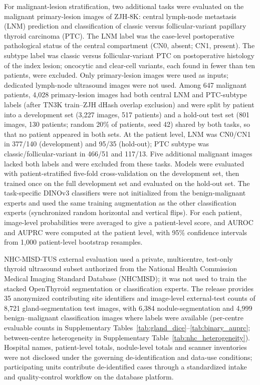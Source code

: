 \documentclass[fleqn,10pt]{wlscirep}
\begin{document}
For malignant-lesion stratification, two additional tasks were evaluated on the malignant primary-lesion images of ZJH-8K: central lymph-node metastasis (LNM) prediction and classification of classic versus follicular-variant papillary thyroid carcinoma (PTC). The LNM label was the case-level postoperative pathological status of the central compartment (CN0, absent; CN1, present). The subtype label was classic versus follicular-variant PTC on postoperative histology of the index lesion; oncocytic and clear-cell variants, each found in fewer than ten patients, were excluded. Only primary-lesion images were used as inputs; dedicated lymph-node ultrasound images were not used. Among 647 malignant patients, 4,028 primary-lesion images had both central LNM and PTC-subtype labels (after TN3K train--ZJH dHash overlap exclusion) and were split by patient into a development set (3,227 images, 517 patients) and a hold-out test set (801 images, 130 patients; random 20\% of patients, seed 42) shared by both tasks, so that no patient appeared in both sets. At the patient level, LNM was CN0/CN1 in 377/140 (development) and 95/35 (hold-out); PTC subtype was classic/follicular-variant in 466/51 and 117/13. Five additional malignant images lacked both labels and were excluded from these tasks. Models were evaluated with patient-stratified five-fold cross-validation on the development set, then trained once on the full development set and evaluated on the hold-out set. The task-specific DINOv3 classifiers were not initialized from the benign-malignant experts and used the same training augmentation as the other classification experts (synchronized random horizontal and vertical flips). For each patient, image-level probabilities were averaged to give a patient-level score, and AUROC and AUPRC were computed at the patient level, with 95\% confidence intervals from 1,000 patient-level bootstrap resamples.

NHC-MISD-TUS external evaluation used a private, multicentre, test-only thyroid ultrasound subset authorized from the National Health Commission Medical Imaging Standard Database (NHCMISD); it was not used to train the stacked OpenThyroid segmentation or classification experts. The release provides 35 anonymized contributing site identifiers and image-level external-test counts of 8{,}721 gland-segmentation test images, with 6{,}384 nodule-segmentation and 4{,}999 benign--malignant classification images where labels were available (per-centre evaluable counts in Supplementary Tables~\ref{tab:gland_dice}--\ref{tab:binary_auprc}; between-centre heterogeneity in Supplementary Table~\ref{tab:nhc_heterogeneity}). Hospital names, patient-level totals, nodule-level totals and scanner inventories were not disclosed under the governing de-identification and data-use conditions; participating units contribute de-identified cases through a standardized intake and quality-control workflow on the database platform.
\end{document}
